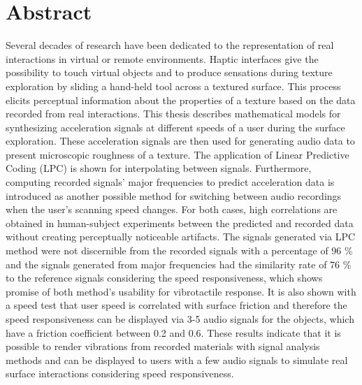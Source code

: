 
\thispagestyle{plain}

\section*{Abstract}


\switchlanguage{\lang} %
Several decades of research have been dedicated to the representation of real interactions in virtual or remote environments. Haptic interfaces give the possibility to touch virtual objects and to produce sensations during texture exploration by sliding a hand-held tool across a textured surface. This process elicits perceptual information about the properties of a texture based on the data recorded from real interactions. This thesis describes mathematical models for synthesizing acceleration signals at different speeds of a user during the surface exploration. These acceleration signals are then used for generating audio data to present microscopic roughness of a texture. The application of Linear Predictive Coding (LPC) is shown for interpolating between signals. Furthermore, computing recorded signals' major frequencies to predict acceleration data is introduced as another possible method for switching between audio recordings when the user's scanning speed changes. For both cases, high correlations are obtained in human-subject experiments between the predicted and recorded data without creating perceptually noticeable artifacts.  The signals generated via LPC method were not discernible from the recorded signals with a percentage of 96 \% and the signals generated from major frequencies had the similarity rate of 76 \% to the reference signals considering the speed responsiveness, which shows promise of both method's usability for vibrotactile response. It is also shown with a speed test that user speed is correlated with surface friction and therefore the speed responsiveness can be displayed via 3-5 audio signals for the objects, which have a friction coefficient between 0.2 and 0.6. These results indicate that it is possible to render vibrations from recorded materials with signal analysis methods and can be displayed to users with a few audio signals to simulate real surface interactions considering speed responsiveness.






